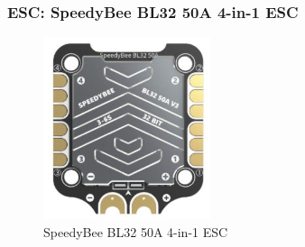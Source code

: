 \documentclass[12pt]{report}
\begin{document}
      \subsubsection{ESC: SpeedyBee BL32 50A 4-in-1 ESC} 
      \begin{figure}
        \includegraphics[width=1\linewidth]{esc.png}
        \caption{SpeedyBee BL32 50A 4-in-1 ESC}
        \label{fig:esc50a}
      \end{figure}
\end{document}
